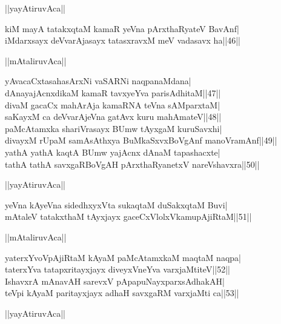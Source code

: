 \documentclass{article}
\begin{document}
\begin{center}
||yayAtiruvAca||
\end{center}

kiM mayA tatakxqtaM kamaR yeVna pArxthaRyateV BavAnf|\\
iMdarxsayx deVvarAjasayx tatasxravxM meV vadasavx ha||46||\\

\begin{center}
||mAtaliruvAca||
\end{center}

yAvacaCxtasahasArxNi vaSARNi naqpanaMdana|\\
dAnayajAcnxdikaM kamaR tavxyeYva parisAdhitaM||47||\\
divaM gacaCx mahArAja kamaRNA teVna sAMparxtaM|\\
saKayxM ca deVvarAjeVna gatAvx kuru mahAmateV||48||\\
paMcAtamxka shariVrasayx BUmw tAyxgaM kuruSavxhi|\\
divayxM rUpaM samAsAthxya BuMkaSxvxBoVgAnf manoVramAnf||49||\\
yathA yathA kaqtA BUmw yajAcnx dAnaM tapashacxte|\\
tathA tathA savxgaRBoVgAH pArxthaRyanetxV nareVshavxra||50||\\

\begin{center}
||yayAtiruvAca||
\end{center}

yeVna kAyeVna sidedhxyxVta sukaqtaM duSakxqtaM Buvi|\\
mAtaleV tatakxthaM tAyxjayx gaceCxVlolxVkamupAjiRtaM||51||\\

\begin{center}
||mAtaliruvAca||
\end{center}

yaterxYvoVpAjiRtaM kAyaM paMcAtamxkaM maqtaM naqpa|\\
taterxYva tatapxritayxjayx diveyxVneYva varxjaMtiteV||52||\\
IshavxrA mAnavAH sarevxV pApapuNayxparxsAdhakAH|\\
teVpi kAyaM paritayxjayx adhaH savxgaRM varxjaMti ca||53||\\

\begin{center}
||yayAtiruvAca||
\end{center}
\end{document}
